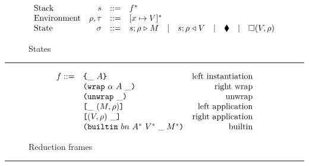 \begin{figure*}[!ht]
\caption{The CEK Machine}\label{fig:cek-machine}

\begin{subfigure}[c]{\linewidth}        %
{\small
\caption{States}
\[
\begin{array}{lrcl}
        \textrm{Stack} & s      & ::= & f^*    \\
        \textrm{Environment} & \rho, \tau & ::= & [x \mapsto V]^* \\
        \textrm{State} & \sigma & ::= & s;\rho \mathrel\triangleright M \quad | \quad s;\rho \mathrel\triangleleft V  \quad | \quad \blacklozenge{} \quad | \quad \square (V,\rho)
    \end{array}
\]
}
\end{subfigure}

\vspace{3mm}
\hrule
\vspace{3mm}

\begin{subfigure}[c]{\linewidth}  %
{\small
\caption{Reduction frames}
\[
    \begin{array}{rlr}
       f ::= & \texttt{\{}\_ ~ A\texttt{\}}                     & \textrm{left instantiation}\\
             & \texttt{(} \texttt{wrap} ~ \alpha ~ A ~ \_ \texttt{)}            & \textrm{right wrap}\\
             & \texttt{(} \texttt{unwrap} ~ \_ \texttt{)}{}                        & \textrm{unwrap}\\
             & \texttt{[} \_ ~ (M,\rho) \texttt{]}                 & \textrm{left application}\\
             & \texttt{[} (V,\rho) ~ \_ \texttt{]}                & \textrm{right application}\\
             & \texttt{(} \texttt{builtin} ~ bn ~ A^* ~ V^*\; \_\; M^* \texttt{)}        & \textrm{builtin}\\
    \end{array}
\]
}
\end{subfigure}

\vspace{3mm}
\hrule
\vspace{3mm}


\end{figure*}
